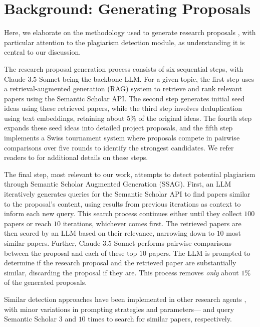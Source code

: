 \section{Background: Generating Proposals}
\label{sec:background}


Here, we elaborate on the methodology
used to generate research proposals \citep{si2024can},
with particular attention to the plagiarism detection module, 
as understanding it is central to our discussion.

The research proposal generation process consists of six sequential steps,
with Claude $3.5$ Sonnet \citep{claude35sonnet} being the backbone LLM. 
For a given topic, the first 
step uses a retrieval-augmented generation (RAG) system 
to retrieve and rank 
relevant papers 
using the Semantic Scholar API. %
The second step generates initial seed ideas 
using these retrieved papers, 
while the third step 
involves 
deduplication using text embeddings, retaining about $5\%$ of the original ideas. 
The fourth step expands these seed ideas into detailed project proposals, 
and the fifth step implements a Swiss tournament system 
where proposals compete in pairwise comparisons over five rounds 
to identify the strongest candidates. 
We refer readers to \cite{si2024can} for additional details on these steps.

The final step, 
most relevant to our work, 
attempts 
to detect potential plagiarism through Semantic Scholar Augmented Generation (SSAG). 
First, an LLM iteratively 
generates queries 
for the Semantic Scholar API 
to find papers similar to the proposal's content,
using results from previous iterations as context to inform each new query.
This search process continues 
either until they collect $100$ papers 
or reach $10$ iterations, 
whichever comes first. 
The retrieved papers are then scored by an LLM 
based on their relevance, 
narrowing down to $10$ most similar papers. 
Further, Claude $3.5$ Sonnet 
performs pairwise comparisons 
between the proposal and each of these top $10$ papers. 
The LLM is prompted to 
determine if the research proposal and the retrieved paper are substantially similar, 
discarding the proposal if they are. 
This process removes \emph{only} about $1\%$ of the generated proposals.

Similar 
detection approaches
have been implemented in other research agents \citep{li2024chain,lu2024ai}, 
with minor variations in prompting strategies 
and parameters---\citet{li2024chain} and \citet{lu2024ai} query Semantic Scholar $3$ and $10$ times to search for similar papers, respectively. 

